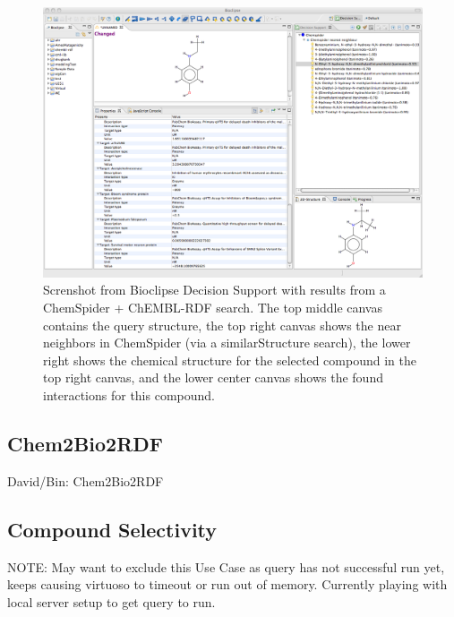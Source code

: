 \documentclass[10pt]{bmc_article}
\newenvironment{bmcformat}{\begin{raggedright}\baselineskip20pt\sloppy\setboolean{publ}{false}}{\end{raggedright}\baselineskip20pt\sloppy}
\begin{document}
\begin{bmcformat}
\begin{figure}[!ht]
		\begin{center}
		\includegraphics[width=16cm]{bioclipse-ds.png}
		\newline
		\caption[wee]{Screnshot from Bioclipse Decision Support with results from a ChemSpider + ChEMBL-RDF search. The top middle canvas contains the query structure, the top right canvas shows the near neighbors in ChemSpider (via a similarStructure search), the lower right shows the chemical structure for the selected compound in the top right canvas, and the lower center canvas shows the found interactions for this compound.}
	\label{fig:bioclipse-ds}
		\end{center}
\end{figure}


\subsection*{Chem2Bio2RDF}

David/Bin: Chem2Bio2RDF

\subsection*{Compound Selectivity}

NOTE: May want to exclude this Use Case as query has not successful run yet, keeps causing virtuoso 
to timeout or run out of memory. Currently playing with local server setup to get query to run.


\end{bmcformat}
\end{document}
